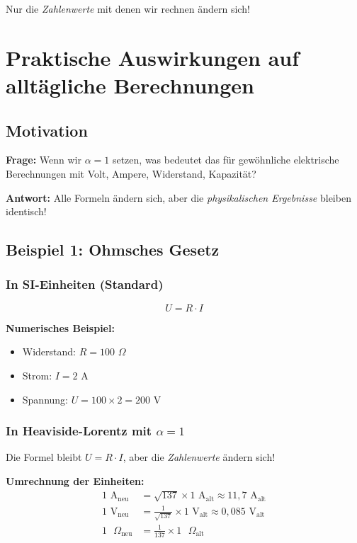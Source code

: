 	Nur die \textit{Zahlenwerte} mit denen wir rechnen ändern sich!
	
	\section{Praktische Auswirkungen auf alltägliche Berechnungen}
	\label{sec:practical_calculations}
	
	\subsection{Motivation}
	
	\textbf{Frage:} Wenn wir $\alpha = 1$ setzen, was bedeutet das für gewöhnliche elektrische Berechnungen mit Volt, Ampere, Widerstand, Kapazität?
	
	\textbf{Antwort:} Alle Formeln ändern sich, aber die \textit{physikalischen Ergebnisse} bleiben identisch!
	
	\subsection{Beispiel 1: Ohmsches Gesetz}
	
	\subsubsection{In SI-Einheiten (Standard)}
	
	\begin{equation}
		U = R \cdot I
	\end{equation}
	
	\textbf{Numerisches Beispiel:}
	\begin{itemize}
		\item Widerstand: $R = 100$ $\Omega$
		\item Strom: $I = 2$ A
		\item Spannung: $U = 100 \times 2 = 200$ V
	\end{itemize}
	
	\subsubsection{In Heaviside-Lorentz mit $\alpha = 1$}
	
	Die Formel bleibt $U = R \cdot I$, aber die \textit{Zahlenwerte} ändern sich!
	
	\textbf{Umrechnung der Einheiten:}
	\begin{align}
		1 \text{ A}_{\text{neu}} &= \sqrt{137} \times 1 \text{ A}_{\text{alt}} \approx 11{,}7 \text{ A}_{\text{alt}} \\
		1 \text{ V}_{\text{neu}} &= \frac{1}{\sqrt{137}} \times 1 \text{ V}_{\text{alt}} \approx 0{,}085 \text{ V}_{\text{alt}} \\
		1 \text{ }\Omega_{\text{neu}} &= \frac{1}{137} \times 1 \text{ }\Omega_{\text{alt}}
	\end{align}
	
